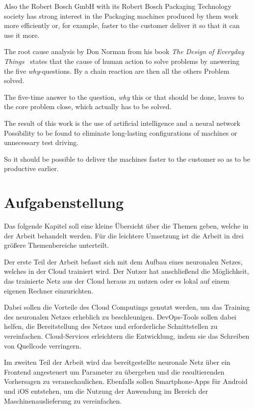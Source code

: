 Also the Robert Bosch GmbH with its Robert Bosch Packaging Technology society has strong interest in the Packaging
machines produced by them work more efficiently or, for example, faster to the customer deliver it so that it can use it
more.

The root cause analysis by Don Norman from his book \textit{The Design of Everyday
Things}~\cite{book_einleitung_donnorman} states that the cause of human action to solve problems by answering the five
\textit{why}-questions. By a chain reaction are then all the others Problem solved.

The five-time answer to the question, \textit{why} this or that should be done, leaves to the core problem close, which
actually has to be solved.

The result of this work is the use of artificial intelligence and a neural network Possibility to be found to eliminate
long-lasting configurations of machines or unnecessary test driving.

So it should be possible to deliver the machines faster to the customer so as to be productive earlier.

\newpage

\section{Aufgabenstellung}
\label{sec:aufgabenstellung}
Das folgende Kapitel soll eine kleine Übersicht über die Themen geben, welche in der Arbeit behandelt werden. Für die
leichtere Umsetzung ist die Arbeit in drei größere Themenbereiche unterteilt.

Der erste Teil der Arbeit befasst sich mit dem Aufbau eines neuronalen Netzes, welches in der Cloud trainiert wird. Der
Nutzer hat anschließend die Möglichkeit, das trainierte Netz aus der Cloud heraus zu nutzen oder es lokal auf einem
eigenen Rechner einzurichten.

Dabei sollen die Vorteile des Cloud Computings genutzt werden, um das Training des neuronalen Netzes erheblich zu
beschleunigen. DevOps-Tools sollen dabei helfen, die Bereitstellung des Netzes und erforderliche Schnittstellen zu
vereinfachen. Cloud-Services erleichtern die Entwicklung, indem sie das Schreiben von Quellcode verringern.

Im zweiten Teil der Arbeit wird das bereitgestellte neuronale Netz über ein Frontend angesteuert um Parameter zu
übergeben und die resultierenden Vorhersagen zu veranschaulichen. Ebenfalls sollen Smartphone-Apps für Android und iOS
entstehen, um die Nutzung der Anwendung im Bereich der Maschinenauslieferung zu vereinfachen.

